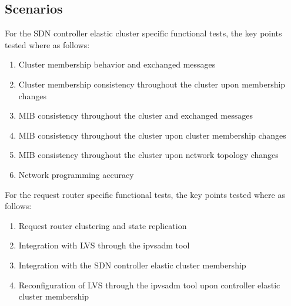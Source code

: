 \subsection{Scenarios}
\label{subsection:functional-tests-scenarios}
For the \gls{SDN} controller elastic cluster specific functional tests, the key points tested where as follows:
\begin{enumerate}
	\item Cluster membership behavior and exchanged messages
	\item Cluster membership consistency throughout the cluster upon membership changes
	\item \gls{MIB} consistency throughout the cluster and exchanged messages
	\item \gls{MIB} consistency throughout the cluster upon cluster membership changes
	\item \gls{MIB} consistency throughout the cluster upon network topology changes
	\item Network programming accuracy
\end{enumerate}
%
For the request router specific functional tests, the key points tested where as follows:
\begin{enumerate}
	\item Request router clustering and state replication
	\item Integration with \gls{LVS} through the ipvsadm tool
	\item Integration with the \gls{SDN} controller elastic cluster membership
	\item Reconfiguration of \gls{LVS} through the ipvsadm tool upon controller elastic cluster membership
\end{enumerate}
%
%
